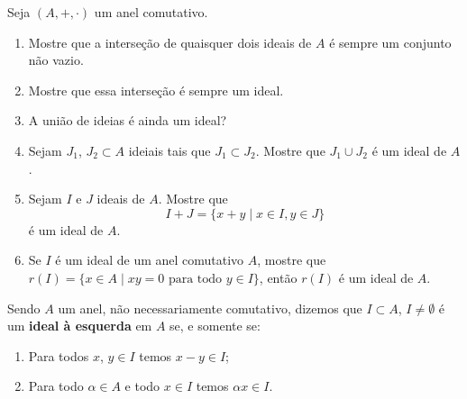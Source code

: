 \documentclass[12pt]{exam}
\begin{document}
    \vspace{.3cm}

    \questao{} Seja $(A, +, \cdot)$ um anel comutativo.
    \begin{enumerate}[label=({\alph*})]
        \item Mostre que a interse\c{c}\~ao de quaisquer dois ideais de $A$ \'e sempre um conjunto n\~ao vazio.

        \item Mostre que essa interse\c{c}\~ao \'e sempre um ideal.

        \item A uni\~ao de ideias \'e ainda um ideal?

        \item Sejam $J_1$, $J_2 \subset A$ ideiais tais que $J_1 \subset J_2$. Mostre que $J_1 \cup J_2$ \'e um ideal de $A$.

        \item Sejam $I$ e $J$ ideais de $A$. Mostre que
        \[
            I + J = \{x + y \mid x \in I, y \in J\}
        \]
        \'e um ideal de $A$.

    \item Se $I$ é um ideal de um anel comutativo $A$, mostre que $r(I) = \{x \in A \mid xy = 0 \mbox{ para todo } y \in I\}$, então $r(I)$ é um ideal de $A$.
    \end{enumerate}

    \vspace{.3cm}

    \questao{} Sendo $A$ um anel, n\~ao necessariamente comutativo, dizemos que $I \subset A$, $I \ne \emptyset$ \'e um \textbf{ideal \`a esquerda} em $A$ se, e somente se:
    \begin{enumerate}[label=({\roman*})]
        \item Para todos $x$, $y \in I$ temos $x - y \in I$;

        \item Para todo $\alpha \in A$ e todo $x \in I$ temos $\alpha x \in I$.
    \end{enumerate}
\end{document}
